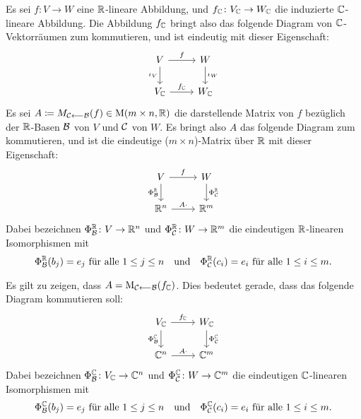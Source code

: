 \documentclass[a4paper,10pt]{article}
\begin{document}
Es sei $f \colon V \to W$ eine $\mathbb{R}$-lineare Abbildung, und $f_{\mathbb{C}} \colon V_{\mathbb{C}} \to W_{\mathbb{C}}$ die induzierte $\mathbb{C}$-lineare Abbildung.
Die Abbildung $f_{\mathbb{C}}$ bringt also das folgende Diagram von $\mathbb{C}$-Vektorräumen zum kommutieren, und ist eindeutig mit dieser Eigenschaft:
\[
  \begin{tikzcd}
      V       \arrow[r, "f"]      \arrow[d, "\iota_V"']
    & W                           \arrow[d, "\iota_W"]
    \\
      V_\Cbb  \arrow[r, "f_\Cbb"]
    & W_\Cbb
  \end{tikzcd}
\]
Es sei $A \coloneqq M_{\mathcal{C} \longleftarrow \mathcal{B}}(f) \in \operatorname{M}(m \times n, \mathbb{R})$ die darstellende Matrix von $f$ bezüglich der $\mathbb{R}$-Basen $\mathcal{B}$ von $V$ und $\mathcal{C}$ von $W$.
Es bringt also $A$ das folgende Diagram zum kommutieren, und ist die eindeutige ($m \times n$)-Matrix über $\mathbb{R}$ mit dieser Eigenschaft:
\[
  \begin{tikzcd}
      V      \arrow[r, "f"]       \arrow[d, "\Phi^\Rbb_\mc{B}"']
    & W                           \arrow[d, "\Phi^\Rbb_\mc{C}"]
    \\
      \Rbb^n \arrow[r, "A \cdot"]
    & \Rbb^m
  \end{tikzcd}
\]
Dabei bezeichnen $\Phi^{\mathbb{R}}_{\mathcal{B}} \colon V \to \mathbb{R}^n$ und $\Phi^{\mathbb{R}}_{\mathcal{C}} \colon W \to \mathbb{R}^m$ die eindeutigen $\mathbb{R}$-linearen Isomorphismen mit
\[
  \text{$\Phi^{\mathbb{R}}_{\mathcal{B}}(b_j) = e_j$ für alle $1 \leq j \leq n$}
  \quad\text{und}\quad
  \text{$\Phi^{\mathbb{R}}_{\mathcal{C}}(c_i) = e_i$ für alle $1 \leq i \leq m$}.
\]

Es gilt zu zeigen, dass $A = \operatorname{M}_{\mathcal{C} \longleftarrow \mathcal{B}}(f_{\mathbb{C}})$.
Dies bedeutet gerade, dass das folgende Diagram kommutieren soll:
\[
  \begin{tikzcd}
      V_\Cbb  \arrow[r, "f_\Cbb"]   \arrow[d, "\Phi^\Cbb_\mc{B}"']
    & W_\Cbb                        \arrow[d, "\Phi^\Cbb_\mc{C}"]
    \\
      \Cbb^n  \arrow[r, "A \cdot"]
    & \Cbb^m
  \end{tikzcd}
\]
Dabei bezeichnen $\Phi^{\mathbb{C}}_{\mathcal{B}} \colon V_{\mathbb{C}} \to \mathbb{C}^n$ und $\Phi^{\mathbb{C}}_{\mathcal{C}} \colon W \to \mathbb{C}^m$ die eindeutigen $\mathbb{C}$-linearen Isomorphismen mit
\[
  \text{$\Phi^{\mathbb{C}}_{\mathcal{B}}(b_j) = e_j$ für alle $1 \leq j \leq n$}
  \quad\text{und}\quad
  \text{$\Phi^{\mathbb{C}}_{\mathcal{C}}(c_i) = e_i$ für alle $1 \leq i \leq m$}.
\]
\end{document}

